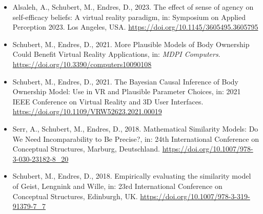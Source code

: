 \documentclass[a4paper,12pt]{memoir} %
\begin{document}





\vspace{1.5em} %

\begin{itemize}
	\item Alsaleh, A., Schubert, M., Endres, D., 2023. The effect of sense of agency on self-efficacy beliefs: A virtual reality paradigm, in: Symposium on Applied Perception 2023. Los Angeles, USA. \url{https://doi.org/10.1145/3605495.3605795}
	\item Schubert, M., Endres, D., 2021. More Plausible Models of Body Ownership Could Benefit Virtual Reality Applications, in: \textit{MDPI Computers}. \url{https://doi.org/10.3390/computers10090108}
	\item Schubert, M., Endres, D., 2021. The Bayesian Causal Inference of Body Ownership Model: Use in VR and Plausible Parameter Choices, in: 2021 IEEE Conference on Virtual Reality and 3D User Interfaces. \url{https://doi.org/10.1109/VRW52623.2021.00019}
	\item Serr, A., Schubert, M., Endres, D., 2018. Mathematical Similarity Models: Do We Need Incomparability to Be Precise?, in: 24th International Conference on Conceptual Structures, Marburg, Deutschland. \url{https://doi.org/10.1007/978-3-030-23182-8_20}
	\item Schubert, M., Endres, D., 2018. Empirically evaluating the similarity model of Geist, Lengnink and Wille, in: 23rd International Conference on Conceptual Structures, Edinburgh, UK. \url{https://doi.org/10.1007/978-3-319-91379-7_7}
\end{itemize}

\end{document}
